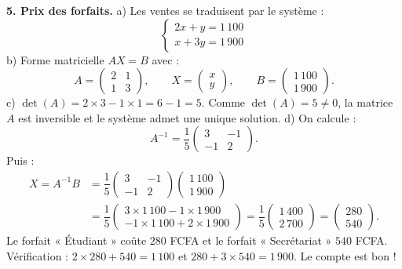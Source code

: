 \documentclass[11pt]{article}
\begin{document}
\begin{exoresolu}
\textbf{5. Prix des forfaits.}
a) Les ventes se traduisent par le système :
\[ \begin{cases} 2x+y=1\,100 \\ x+3y=1\,900 \end{cases} \]
b) Forme matricielle $AX=B$ avec :
\[ A=\begin{pmatrix} 2 & 1 \\ 1 & 3 \end{pmatrix},\qquad X=\begin{pmatrix} x \\ y \end{pmatrix},\qquad B=\begin{pmatrix} 1\,100 \\ 1\,900 \end{pmatrix}. \]
c) $\det(A)=2\times 3-1\times 1=6-1=5$. Comme $\det(A)=5\neq 0$, la matrice $A$ est inversible et le système admet une unique solution.
d) On calcule :
\[ A^{-1}=\dfrac{1}{5}\begin{pmatrix} 3 & -1 \\ -1 & 2 \end{pmatrix}. \]
Puis :
\begin{align*}
X=A^{-1}B&=\dfrac{1}{5}\begin{pmatrix} 3 & -1 \\ -1 & 2 \end{pmatrix}\begin{pmatrix} 1\,100 \\ 1\,900 \end{pmatrix}\\
&=\dfrac{1}{5}\begin{pmatrix} 3\times 1\,100-1\times 1\,900 \\ -1\times 1\,100+2\times 1\,900 \end{pmatrix}=\dfrac{1}{5}\begin{pmatrix} 1\,400 \\ 2\,700 \end{pmatrix}=\begin{pmatrix} 280 \\ 540 \end{pmatrix}.
\end{align*}
Le forfait « Étudiant » coûte $280$ FCFA et le forfait « Secrétariat » $540$ FCFA. Vérification : $2\times 280+540=1\,100$ et $280+3\times 540=1\,900$. Le compte est bon !


\end{exoresolu}
\end{document}
